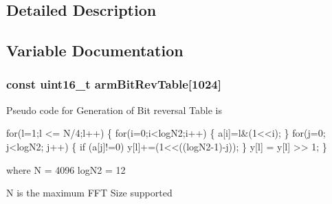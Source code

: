 \subsection{Detailed Description}


\subsection{Variable Documentation}
\subsubsection[{\texorpdfstring{arm\+Bit\+Rev\+Table}{armBitRevTable}}]{\setlength{\rightskip}{0pt plus 5cm}const uint16\+\_\+t arm\+Bit\+Rev\+Table\mbox{[}1024\mbox{]}}\hypertarget{group__CFFT__CIFFT_gae247e83ad50d474107254e25b36ad42b}{}\label{group__CFFT__CIFFT_gae247e83ad50d474107254e25b36ad42b}
\begin{DoxyParagraph}{}
Pseudo code for Generation of Bit reversal Table is 
\end{DoxyParagraph}
\begin{DoxyParagraph}{}

\begin{DoxyPre}for(l=1;l <= N/4;l++)
\{
  for(i=0;i<logN2;i++)
  \{
    a[i]=l\&(1<<i);
  \}
  for(j=0; j<logN2; j++)
  \{
    if (a[j]!=0)
    y[l]+=(1<<((logN2-1)-j));
  \}
  y[l] = y[l] >> 1;
 \} \end{DoxyPre}
 
\end{DoxyParagraph}
\begin{DoxyParagraph}{}
where N = 4096 log\+N2 = 12 
\end{DoxyParagraph}
\begin{DoxyParagraph}{}
N is the maximum F\+FT Size supported 
\end{DoxyParagraph}
